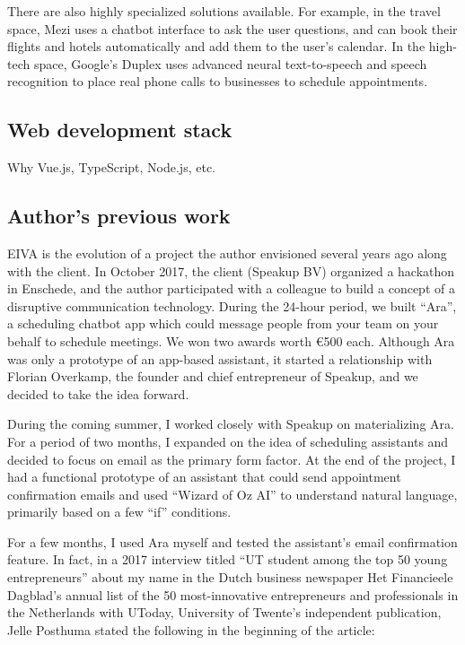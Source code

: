 \documentclass{article}
\begin{document}
There are also highly specialized solutions available. For example, in the travel space, Mezi uses a chatbot interface to ask the user questions, and can book their flights and hotels automatically and add them to the user’s calendar. In the high-tech space, Google’s Duplex uses advanced neural text-to-speech and speech recognition to place real phone calls to businesses to schedule appointments.

\subsection{Web development stack}

Why Vue.js, TypeScript, Node.js, etc.

\subsection{Author's previous work}

EIVA is the evolution of a project the author envisioned several years ago along with the client. In October 2017, the client (Speakup BV) organized a hackathon in Enschede, and the author participated with a colleague to build a concept of a disruptive communication technology. During the 24-hour period, we built “Ara”, a scheduling chatbot app which could message people from your team on your behalf to schedule meetings. We won two awards worth €500 each. Although Ara was only a prototype of an app-based assistant, it started a relationship with Florian Overkamp, the founder and chief entrepreneur of Speakup, and we decided to take the idea forward.

During the coming summer, I worked closely with Speakup on materializing Ara. For a period of two months, I expanded on the idea of scheduling assistants and decided to focus on email as the primary form factor. At the end of the project, I had a functional prototype of an assistant that could send appointment confirmation emails and used “Wizard of Oz AI” to understand natural language, primarily based on a few “if” conditions.

For a few months, I used Ara myself and tested the assistant’s email confirmation feature. In fact, in a 2017 interview titled “UT student among the top 50 young entrepreneurs” about my name in the Dutch business newspaper Het Financieele Dagblad’s annual list of the 50 most-innovative entrepreneurs and professionals in the Netherlands with UToday, University of Twente’s independent publication, Jelle Posthuma stated the following in the beginning of the article:
\end{document}

